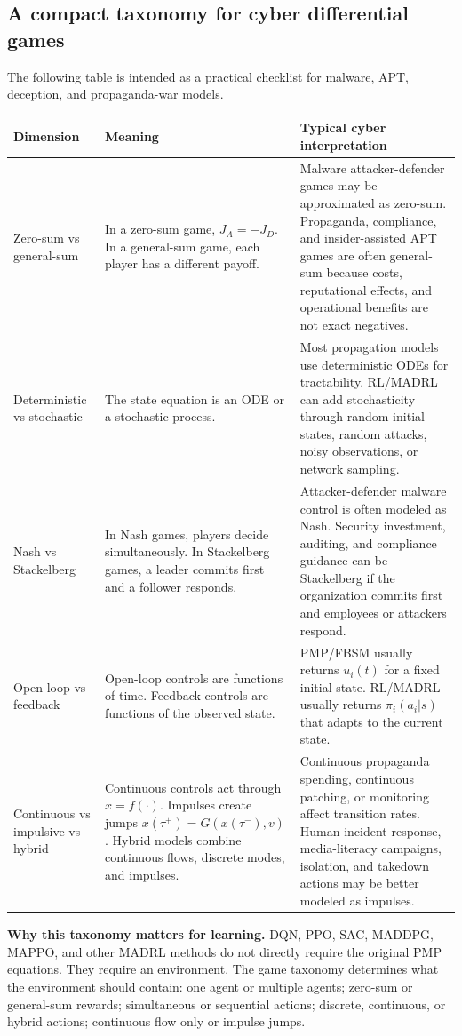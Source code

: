\documentclass[11pt,a4paper]{article}
\begin{document}
\subsection{A compact taxonomy for cyber differential games}
The following table is intended as a practical checklist for malware, APT, deception, and propaganda-war models.

\begin{longtable}{p{}p{}p{}}
\toprule
Dimension & Meaning & Typical cyber interpretation \\
\midrule
Zero-sum vs general-sum & In a zero-sum game, $J_A=-J_D$. In a general-sum game, each player has a different payoff. & Malware attacker-defender games may be approximated as zero-sum. Propaganda, compliance, and insider-assisted APT games are often general-sum because costs, reputational effects, and operational benefits are not exact negatives. \\
Deterministic vs stochastic & The state equation is an ODE or a stochastic process. & Most propagation models use deterministic ODEs for tractability. RL/MADRL can add stochasticity through random initial states, random attacks, noisy observations, or network sampling. \\
Nash vs Stackelberg & In Nash games, players decide simultaneously. In Stackelberg games, a leader commits first and a follower responds. & Attacker-defender malware control is often modeled as Nash. Security investment, auditing, and compliance guidance can be Stackelberg if the organization commits first and employees or attackers respond. \\
Open-loop vs feedback & Open-loop controls are functions of time. Feedback controls are functions of the observed state. & PMP/FBSM usually returns $u_i(t)$ for a fixed initial state. RL/MADRL usually returns $\pi_i(a_i|s)$ that adapts to the current state. \\
Continuous vs impulsive vs hybrid & Continuous controls act through $\dot{x}=f(\cdot)$. Impulses create jumps $x(\tau^+)=G(x(\tau^-),v)$. Hybrid models combine continuous flows, discrete modes, and impulses. & Continuous propaganda spending, continuous patching, or monitoring affect transition rates. Human incident response, media-literacy campaigns, isolation, and takedown actions may be better modeled as impulses. \\
\bottomrule
\end{longtable}

\begin{boxednote}
\textbf{Why this taxonomy matters for learning.}
DQN, PPO, SAC, MADDPG, MAPPO, and other MADRL methods do not directly require the original PMP equations. They require an environment. The game taxonomy determines what the environment should contain: one agent or multiple agents; zero-sum or general-sum rewards; simultaneous or sequential actions; discrete, continuous, or hybrid actions; continuous flow only or impulse jumps.
\end{boxednote}
\end{document}
